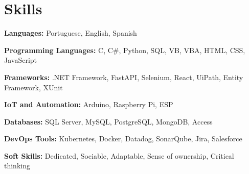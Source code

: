\section{Skills}
	\begin{SkillHighlights} %
		\item \textbf{Languages:} Portuguese, English, Spanish
		\item \textbf{Programming Languages:} C, C\#, Python, SQL, VB, VBA, HTML, CSS, JavaScript
		\item \textbf{Frameworks:} .NET Framework, FastAPI, Selenium, React, UiPath, Entity Framework, XUnit
		\item \textbf{IoT and Automation:} Arduino, Raspberry Pi, ESP
				
		\switchcolumn %
		
		\item \textbf{Databases:} SQL Server, MySQL, PostgreSQL, MongoDB, Access		
		\item \textbf{DevOps Tools:} Kubernetes, Docker, Datadog, SonarQube, Jira, Salesforce
		\item \textbf{Soft Skills:} Dedicated, Sociable, Adaptable, Sense of ownership, Critical thinking
	\end{SkillHighlights}